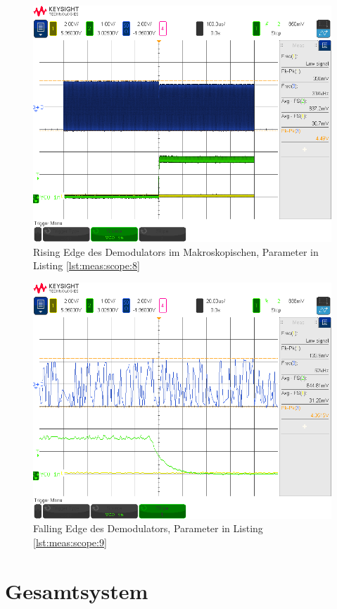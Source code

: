 \begin{figure}[h!tb]
    \centering
    \includegraphics[width=1\textwidth, trim=0mm 21mm 0mm 11mm, clip]{images/scopeShots/scope_8b.png}
    \caption{Rising Edge des Demodulators im Makroskopischen, Parameter in Listing \ref{lst:meas:scope:8}}
    \label{fig:meas:scope:8}
\end{figure}

\begin{figure}[h!tb]
    \centering
    \includegraphics[width=1\textwidth, trim=0mm 21mm 0mm 11mm, clip]{images/scopeShots/scope_9b.png}
    \caption{Falling Edge des Demodulators, Parameter in Listing \ref{lst:meas:scope:9}}
    \label{fig:meas:scope:9}
\end{figure}


\section{Gesamtsystem}
\label{sec:validierung:total}
